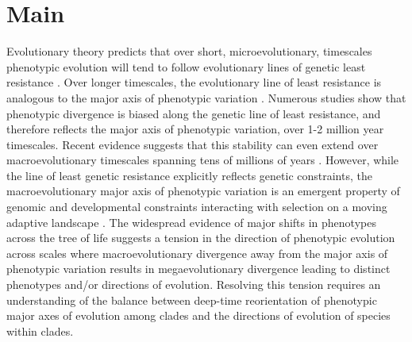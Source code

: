 \documentclass[12pt,letterpaper]{article}
\begin{document}


\section{Main}

Evolutionary theory predicts that over short, microevolutionary, timescales phenotypic evolution will tend to follow evolutionary lines of genetic least resistance \cite{schluter1996adaptive}.
Over longer timescales, the evolutionary line of least resistance is analogous to the major axis of phenotypic variation \cite{marroig2005size,fasanelli2022allometry}.
Numerous studies show that phenotypic divergence is biased along the genetic line of least resistance, and therefore reflects the major axis of phenotypic variation, over 1-2 million year timescales.
Recent evidence suggests that this stability can even extend over macroevolutionary timescales spanning tens of millions of years \cite{mcglothlin2018adaptive}.
However, while the line of least genetic resistance explicitly reflects genetic constraints, the macroevolutionary major axis of phenotypic variation is an emergent property of genomic and developmental constraints interacting with selection on a moving adaptive landscape \cite{jones2004evolution}.
The widespread evidence of major shifts in phenotypes across the tree of life \cite{pagel2022general,cooney2017mega,venditti2011multiple,khabbazian2016fast,smaers2021evolution} suggests a tension in the direction of phenotypic evolution across scales where macroevolutionary divergence away from the major axis of phenotypic variation results in megaevolutionary divergence leading to distinct phenotypes and/or directions of evolution.
Resolving this tension requires an understanding of the balance between deep-time reorientation of phenotypic major axes of evolution among clades and the directions of evolution of species within clades.
\end{document}
